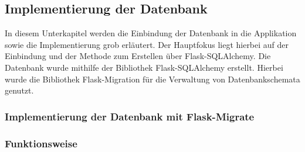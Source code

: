 \subsection{Implementierung der Datenbank}
\label{subsec:implementierung-der-datenbank}

In diesem Unterkapitel werden die Einbindung der Datenbank in die Applikation sowie die Implementierung grob erläutert.
Der Hauptfokus liegt hierbei auf der Einbindung und der Methode zum Erstellen über Flask-SQLAlchemy.
Die Datenbank wurde mithilfe der Bibliothek Flask-SQLAlchemy erstellt. Hierbei wurde die Bibliothek Flask-Migration für die Verwaltung von Datenbankschemata genutzt.

\subsubsection{Implementierung der Datenbank mit Flask-Migrate}


\subsubsection{Funktionsweise}




